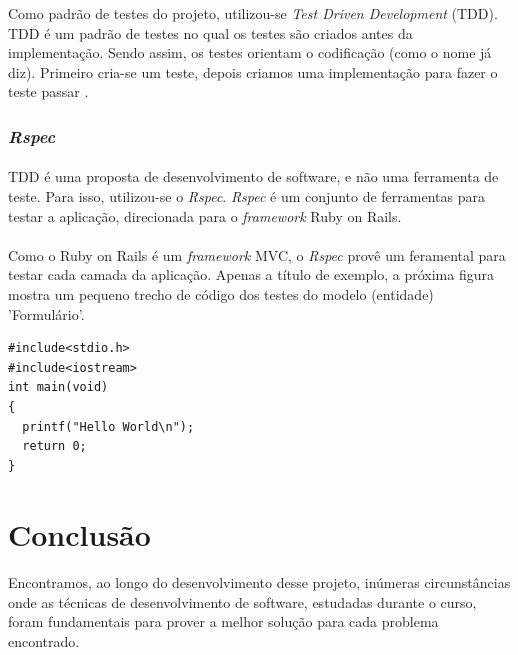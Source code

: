 \documentclass[11pt]{article}
\begin{document}
    Como padrão de testes do projeto, utilizou-se {\em Test Driven 
    Development} (TDD). TDD é um padrão de testes no qual os testes são
    criados antes da implementação. Sendo assim, os testes orientam o
    codificação (como o nome já diz). Primeiro cria-se um teste, depois 
    criamos uma implementação para fazer o teste passar \cite{urubatan}.
     
    \subsubsection{{\em Rspec}}
  
    \paragraph{}

    TDD é uma proposta de desenvolvimento de software, e não uma 
    ferramenta de teste. Para isso, utilizou-se o {\em Rspec}. {\em Rspec}
    é um conjunto de ferramentas para testar a aplicação, direcionada para o
    {\em framework} Ruby on Rails.
    
    \paragraph{}
    
    Como o Ruby on Rails é um {\em framework} MVC, o {\em Rspec} provê um
    feramental para testar cada camada da aplicação. Apenas a título de 
    exemplo, a próxima figura mostra um pequeno trecho de código dos 
    testes do modelo (entidade) 'Formulário'.
    
    {\scriptsize
      \lstset{language=Ruby}
      \begin{lstlisting}
#include<stdio.h>
#include<iostream>
int main(void)
{
  printf("Hello World\n");
  return 0;
}
      \end{lstlisting}
    }
    
    
  \clearpage
      
  \section{Conclusão}

    \paragraph{}
    Encontramos, ao longo do desenvolvimento desse projeto, inúmeras 
    circunstâncias onde as técnicas de desenvolvimento de software, 
    estudadas durante o curso, foram fundamentais para prover a melhor 
    solução para cada problema encontrado.
    
\end{document}
